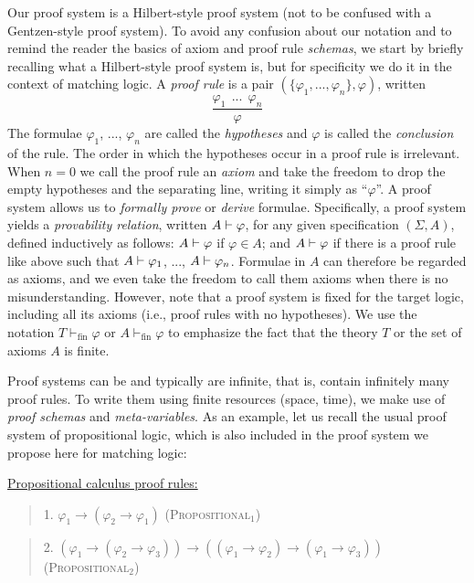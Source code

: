 \documentclass[UTF8,11pt]{article}
\theoremstyle{plain}
\theoremstyle{definition}
\theoremstyle{remark}
\newcommand{\vdashfin}{\vdash_\text{fin}}
\newcommand{\ra}{\rightarrow}
\begin{document}
Our proof system is a Hilbert-style proof system (not to be confused with a
Gentzen-style proof system).
To avoid any confusion about our notation and to remind the reader the
basics of axiom and proof rule \emph{schemas}, we start by briefly recalling
what a Hilbert-style proof system is, but for specificity we do it in the
context of matching logic.
A \emph{proof rule} is a pair $(\{\varphi_1,...,\varphi_n\},\varphi)$,
written
$$
\frac{
\varphi_1 \ \ ... \ \ \varphi_n
}{\varphi}
$$
The formulae $\varphi_1$, ..., $\varphi_n$ are called the \emph{hypotheses}
and $\varphi$ is called the \emph{conclusion} of the rule.
The order in which the hypotheses occur in a proof rule is irrelevant.
When $n = 0$ we call the proof rule an \emph{axiom} and take the freedom to
drop the empty hypotheses and the separating line, writing it simply as
``$\varphi$''.
A proof system allows us to \emph{formally prove} or \emph{derive} formulae.
Specifically, a proof system yields a \emph{provability relation}, written
${A}\vdash{\varphi}$, for any given specification $(\Sigma,A)$, defined
inductively as follows:
${A}\vdash{\varphi}$ if $\varphi \in A$; and
${A}\vdash{\varphi}$ if there is a proof rule like above such that
${A}\vdash{\varphi_1}$, ..., ${A}\vdash{\varphi_n}$.
Formulae in $A$ can therefore be regarded as axioms, and we even take the
freedom to call them axioms when there is no misunderstanding.
However, note that a proof system is fixed for the target logic, including
all its axioms (i.e., proof rules with no hypotheses).
We use the notation $T \vdashfin \varphi$ or $A \vdashfin \varphi$ to emphasize the fact that the theory $T$ or the set of axioms $A$ is finite.

Proof systems can be and typically are infinite, that is, contain infinitely
many proof rules.
To write them using finite resources (space, time), we make use of \emph{proof schemas}
and \emph{meta-variables}.
As an example, let us recall the usual proof system of propositional logic,
which is also included in the proof system we propose here for matching logic:

\vspace*{2ex}

\noindent
\underline{Propositional calculus proof rules:}

\begin{quote}
1. $\varphi_1 \ra (\varphi_2 \ra \varphi_1)$
\hfill \textsc{(Propositional$_1$)}
\end{quote}

\begin{quote}
2. $(\varphi_1 \ra (\varphi_2 \ra \varphi_3)) \ra ((\varphi_1 \ra \varphi_2) \ra (\varphi_1 \ra \varphi_3))$
\hfill \textsc{(Propositional$_2$)}
\end{quote}
\end{document}
